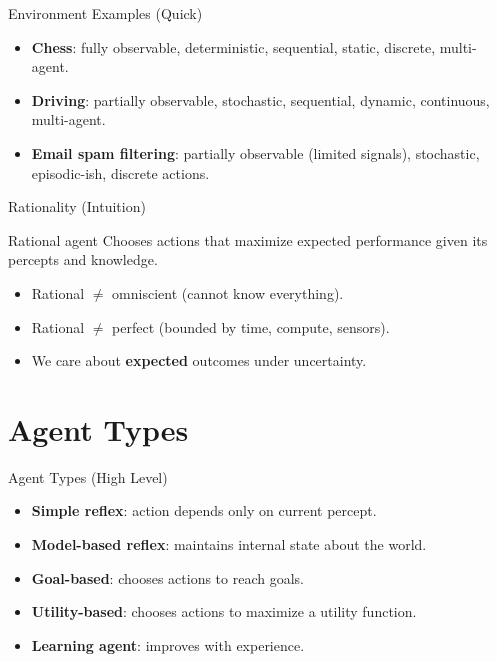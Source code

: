 \documentclass[aspectratio=169]{beamer}
\begin{document}
\begin{frame}{Environment Examples (Quick)}
  \begin{itemize}[<+->]
    \item \textbf{Chess}: fully observable, deterministic, sequential, static, discrete, multi-agent.
    \item \textbf{Driving}: partially observable, stochastic, sequential, dynamic, continuous, multi-agent.
    \item \textbf{Email spam filtering}: partially observable (limited signals), stochastic, episodic-ish, discrete actions.
  \end{itemize}
\end{frame}

\begin{frame}{Rationality (Intuition)}
  \begin{block}{Rational agent}
    Chooses actions that maximize expected performance given its percepts and knowledge.
  \end{block}
  \vspace{0.4em}
  \begin{itemize}[<+->]
    \item Rational $\neq$ omniscient (cannot know everything).
    \item Rational $\neq$ perfect (bounded by time, compute, sensors).
    \item We care about \textbf{expected} outcomes under uncertainty.
  \end{itemize}
\end{frame}

\section{Agent Types}
\label{sec:types}

\begin{frame}{Agent Types (High Level)}
  \begin{itemize}[<+->]
    \item \textbf{Simple reflex}: action depends only on current percept.
    \item \textbf{Model-based reflex}: maintains internal state about the world.
    \item \textbf{Goal-based}: chooses actions to reach goals.
    \item \textbf{Utility-based}: chooses actions to maximize a utility function.
    \item \textbf{Learning agent}: improves with experience.
  \end{itemize}
\end{frame}
\end{document}
